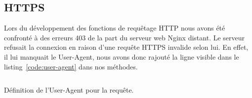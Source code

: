 	\subsection{HTTPS}
		Lors du développement des fonctions de requêtage HTTP nous avons été confronté à des erreurs 403 de la part du serveur web Nginx distant. Le serveur refusait la connexion en raison d'une requête HTTPS invalide selon lui. En effet, il lui manquait le User-Agent, nous avons donc rajouté la ligne visible dans le listing~\ref{code:user-agent} dans nos méthodes.

		\begin{code}
			\inputminted[fontsize=\small]{java}{code/user-agent.java}
			\caption{Définition de l'User-Agent pour la requête.}
			\label{code:user-agent}
		\end{code}

